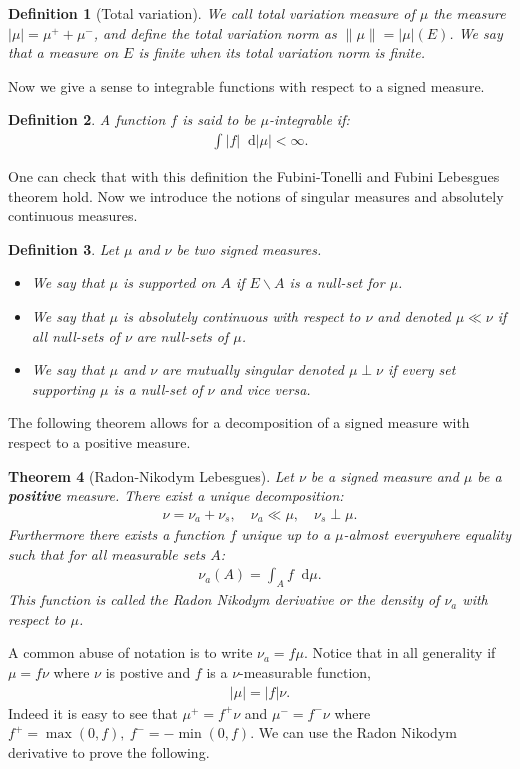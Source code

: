 \documentclass[11pt,a4paper]{article}
\newcommand{\dd}{\mathop{}\!\mathrm{d}}
\newtheorem{theorem}{Theorem}[section]
\newtheorem{definition}[theorem]{Definition}
\begin{document}
\begin{definition}[Total variation]
    We call total variation measure of $\mu$ the measure $|\mu| = \mu^+ + \mu^-$, and define the total variation norm as $\|\mu\| = |\mu|(E)$. We say that a measure on $E$ is finite when its total variation norm is finite.
\end{definition}
Now we give a sense to integrable functions with respect to a signed measure.
\begin{definition}
    A function $f$ is said to be $\mu$-integrable if:
    \begin{align*}
        \int |f|\dd |\mu| < \infty.
    \end{align*}
\end{definition}
One can check that with this definition the Fubini-Tonelli and Fubini Lebesgues theorem hold. Now we introduce the notions of singular measures and absolutely continuous measures. 

\begin{definition}
    Let $\mu$ and $\nu$ be two signed measures.
    \begin{itemize}
        \item We say that $\mu$ is supported on $A$ if $E\backslash A$ is a null-set for $\mu$.
        \item We say that $\mu$ is absolutely continuous with respect to $\nu$ and denoted $\mu \ll \nu$ if all null-sets of $\nu$ are null-sets of $\mu$.
        \item We say that $\mu$ and $\nu$ are mutually singular denoted $\mu \perp \nu$ if every set supporting $\mu$ is a null-set of $\nu$ and vice versa.
    \end{itemize}
\end{definition}
The following theorem allows for a decomposition of a signed measure with respect to a positive measure.
\begin{theorem}[Radon-Nikodym Lebesgues]
    Let $\nu$ be a signed measure and $\mu$ be a \textbf{positive} measure. There exist a unique decomposition:
    \begin{align*}
        \nu = \nu_{a} + \nu_s, \quad  \nu_{a}\ll \mu, \quad \nu_s \perp \mu .
    \end{align*}
    Furthermore there exists a function $f$ unique up to a $\mu$-almost everywhere equality such that for all measurable sets $A$:
    \begin{align*}
        \nu_{a}(A) = \int_A f\dd \mu.
    \end{align*}
    This function is called the Radon Nikodym derivative or the density of $\nu_{a}$ with respect to $\mu$.
\end{theorem}
A common abuse of notation is to write $\nu_{a} = f\mu$. Notice that in all generality if $\mu = f\nu$ where $\nu$ is postive and $f$ is a $\nu$-measurable function,
\begin{align*}
        |\mu| = |f|\nu.
\end{align*}
Indeed it is easy to see that $\mu^+ = f^+\nu$ and $\mu^- = f^- \nu$ where $f^+ = \max(0,f),\ f^- = -\min(0,f)$. We can use the Radon Nikodym derivative to prove the following.
\end{document}
